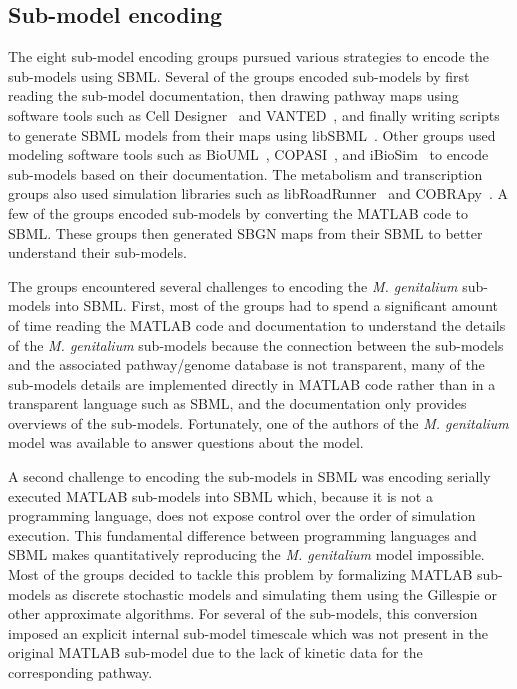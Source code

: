\documentclass[journal,transmag]{IEEEtran}
\begin{document}
\subsection{Sub-model encoding}
The eight sub-model encoding groups pursued various strategies to encode the sub-models using SBML. Several of the groups encoded sub-models by first reading the sub-model documentation, then drawing pathway maps using software tools such as Cell Designer~\cite{funahashi2008celldesigner} and VANTED~\cite{Rohn2012}, and finally writing scripts to generate SBML models from their maps using libSBML~\cite{bornstein_2008}. Other groups used modeling software tools such as BioUML~\cite{Kolpakov2006}, COPASI~\cite{Mendes2009}, and iBioSim~\cite{Madsen2012} to encode sub-models based on their documentation. The metabolism and transcription groups also used simulation libraries such as libRoadRunner~\cite{Somogyi17062015} and COBRApy~\cite{ebrahim2013cobrapy}. A few of the groups encoded sub-models by converting the MATLAB code to SBML. These groups then generated SBGN maps from their SBML to better understand their sub-models.

The groups encountered several challenges to encoding the \textit{M. genitalium} sub-models into SBML. First, most of the groups had to spend a significant amount of time reading the MATLAB code and documentation to understand the details of the \textit{M. genitalium} sub-models because the connection between the sub-models and the associated pathway/genome database is not transparent, many of the sub-models details are implemented directly in MATLAB code rather than in a transparent language such as SBML, and the documentation only provides overviews of the sub-models. Fortunately, one of the authors of the \textit{M. genitalium} model was available to answer questions about the model.

A second challenge to encoding the sub-models in SBML was encoding serially executed MATLAB sub-models into SBML which, because it is not a programming language, does not expose control over the order of simulation execution. This fundamental difference between programming languages and SBML makes quantitatively reproducing the \textit{M. genitalium} model impossible. Most of the groups decided to tackle this problem by formalizing MATLAB sub-models as discrete stochastic models and simulating them using the Gillespie \cite{gillespie1977} or other approximate algorithms. For several of the sub-models, this conversion imposed an explicit internal sub-model timescale which was not present in the original MATLAB sub-model due to the lack of kinetic data for the corresponding pathway.
\end{document}

